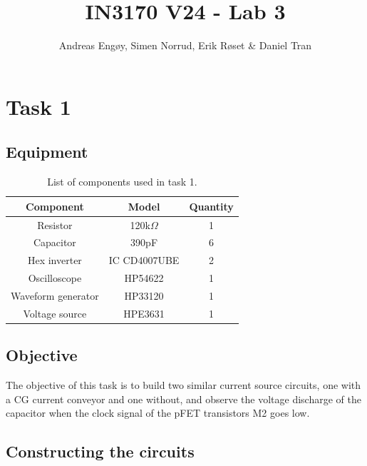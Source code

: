 \documentclass[onecolumn]{article}
\title{IN3170 V24 - Lab 3}
\author{Andreas Engøy, Simen Norrud, Erik Røset \& Daniel Tran}
\date{\monthname[\the\month] \the\year}
\begin{document}
\maketitle


\section{Task 1}
\subsection{Equipment}
\begin{table}[h]
    \centering
    \begin{tabular}{|c|c|c|}
        \hline
        \textbf{Component} & \textbf{Model} & \textbf{Quantity} \\
        \hline
        Resistor & 120k$\Omega$ & 1 \\
        Capacitor & 390pF & 6 \\
        Hex inverter & IC CD4007UBE & 2 \\
        Oscilloscope & HP54622 & 1 \\
        Waveform generator  & HP33120 & 1\\
        Voltage source & HPE3631 & 1 \\
        \hline
    \end{tabular}
    \caption{List of components used in task 1.}
    \label{tab:bom}
\end{table}

\subsection{Objective}
The objective of this task is to build two similar current source circuits, one with a CG current conveyor and one without, and observe the voltage discharge of the capacitor when the clock signal of the pFET transistors M2 goes low.  


\subsection{Constructing the circuits}
\end{document}
